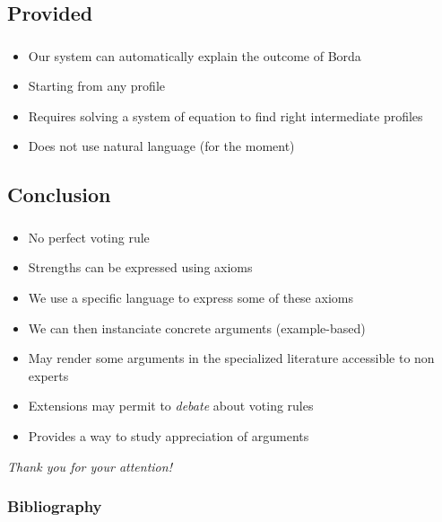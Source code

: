 \documentclass[french,english]{beamer}
\begin{document}
\subsection{Provided}
\begin{frame}
	\frametitle{\subsecname}
	\begin{itemize}
		\item Our system can automatically explain the outcome of Borda
		\item Starting from any profile
		\item Requires solving a system of equation to find right intermediate profiles
		\item Does not use natural language (for the moment)
	\end{itemize}
\end{frame}

\subsection{Conclusion}
\begin{frame}
	\frametitle{\subsecname}
	\begin{itemize}
		\item No perfect voting rule
		\item Strengths can be expressed using axioms
		\item We use a specific language to express some of these axioms
		\item We can then instanciate concrete arguments (example-based)
		\item May render some arguments in the specialized literature accessible to non experts
		\item Extensions may permit to \emph{debate} about voting rules
		\item Provides a way to study appreciation of arguments
	\end{itemize}
\end{frame}

\begin{frame}[plain]
	\addtocounter{framenumber}{-1}
	\begin{center}
		\huge
		\textit{Thank you for your attention!}
	\end{center}
\end{frame}

\appendix
\AtBeginSection{
}

\begin{frame}[allowframebreaks]
	\frametitle{Bibliography}
	\def\newblock{\hskip .11em plus .33em minus .07em}
 	
\end{frame}
\end{document}
